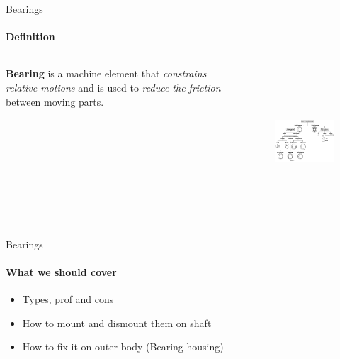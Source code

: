 \documentclass[aspectratio=169]{beamer}
\begin{document}
\begin{frame}[t]{Bearings}
\framesubtitle{Definition}
\vspace{-0.5cm}
    \begin{columns}[T,onlytextwidth]
        \begin{column}{0.39\textwidth}
            \textbf{Bearing} is a machine element that \textit{constrains relative motions} and is used to \textit{reduce the friction} between moving parts.
        \end{column}
        \begin{column}{0.59\textwidth}
            \begin{figure}[H]
                \centering\includegraphics[height=5.5cm,width=1\textwidth,keepaspectratio]{bearing_conf.png}
                \label{fig:bearing_conf.png}
            \end{figure}
        \end{column}
    \end{columns}
\end{frame}

\begin{frame}[t]{Bearings}
\framesubtitle{What we should cover}
    \begin{itemize}
        \item Types, prof and cons
        \item How to mount and dismount them on shaft
        \item How to fix it on outer body (Bearing housing)
    \end{itemize}
\end{frame}
\end{document}

